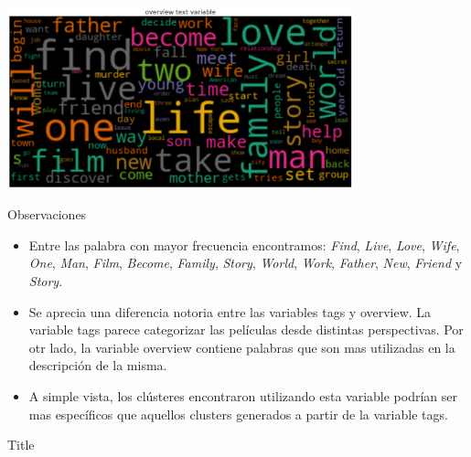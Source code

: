 \documentclass[11pt,a4paper,twoside]{thesis}
\begin{document}
\begin{center}
	\includegraphics[width=10cm]{./images/Cloud-Overview.png}
\end{center}
\begin{description}
	\item[Observaciones]
\end{description}
\begin{itemize}
	\item Entre las palabra con mayor frecuencia encontramos: \textit{Find}, \textit{Live}, \textit{Love}, \textit{Wife}, \textit{One}, \textit{Man}, \textit{Film}, \textit{Become}, \textit{Family}, \textit{Story}, \textit{World}, \textit{Work}, \textit{Father}, \textit{New}, \textit{Friend} y \textit{Story}.
	\item Se aprecia una diferencia notoria entre las variables tags y overview. La variable tags parece categorizar las películas desde distintas perspectivas. Por otr lado, la variable overview contiene palabras que son mas utilizadas en la descripción de la misma.
	\item A simple vista, los clústeres encontraron utilizando esta variable podrían ser mas específicos que aquellos clusters generados a partir de la variable tags.
\end{itemize}

\begin{description}
	\item[Title]
\end{description}
\end{document}
